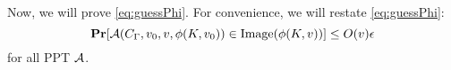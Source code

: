 


Now, we will prove \cref{eq:guessPhi}. For convenience, we will restate \cref{eq:guessPhi}:
\begin{equation*}
	\operatorname*{\mathbf{Pr}}[\mathcal{A}(C_\Gamma, v_0, v, \phi(K, v_0)) \in \text{Image}(\phi(K, v))] \leq O(v)\epsilon
\end{equation*}
for all PPT $\mathcal{A}$.

